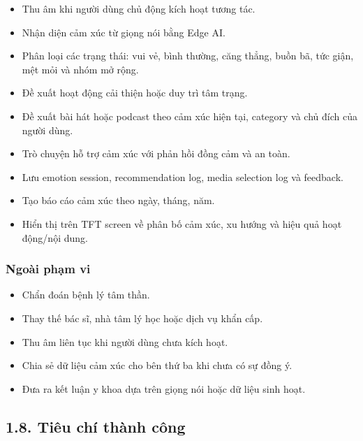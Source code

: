 \documentclass[12pt,a4paper]{article}
\begin{document}
\begin{itemize}
\item Thu âm khi người dùng chủ động kích hoạt tương tác.
\item Nhận diện cảm xúc từ giọng nói bằng Edge AI.
\item Phân loại các trạng thái: vui vẻ, bình thường, căng thẳng, buồn bã, tức giận, mệt mỏi và nhóm mở rộng.
\item Đề xuất hoạt động cải thiện hoặc duy trì tâm trạng.
\item Đề xuất bài hát hoặc podcast theo cảm xúc hiện tại, category và chủ đích của người dùng.
\item Trò chuyện hỗ trợ cảm xúc với phản hồi đồng cảm và an toàn.
\item Lưu emotion session, recommendation log, media selection log và feedback.
\item Tạo báo cáo cảm xúc theo ngày, tháng, năm.
\item Hiển thị trên TFT screen về phân bố cảm xúc, xu hướng và hiệu quả hoạt động/nội dung.
\end{itemize}

\subsubsection*{Ngoài phạm vi}

\begin{itemize}
\item Chẩn đoán bệnh lý tâm thần.
\item Thay thế bác sĩ, nhà tâm lý học hoặc dịch vụ khẩn cấp.
\item Thu âm liên tục khi người dùng chưa kích hoạt.
\item Chia sẻ dữ liệu cảm xúc cho bên thứ ba khi chưa có sự đồng ý.
\item Đưa ra kết luận y khoa dựa trên giọng nói hoặc dữ liệu sinh hoạt.
\end{itemize}

\subsection*{1.8. Tiêu chí thành công}
\end{document}
